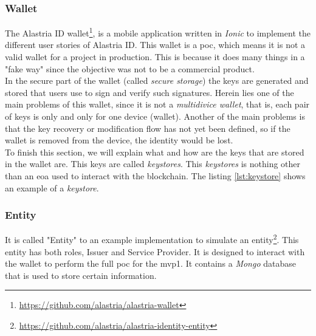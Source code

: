         \subsubsection{Wallet}
            The Alastria ID wallet\footnote{\url{https://github.com/alastria/alastria-wallet}}, is a mobile application written in \textit{Ionic} to implement the different user stories of Alastria ID. This wallet is a \acrfull{poc}, which means it is not a valid wallet for a project in production. This is because it does many things in a "fake way" since the objective was not to be a commercial product.\\
            
            In the secure part of the wallet (called \textit{secure storage}) the keys are generated and stored that users use to sign and verify such signatures. Herein lies one of the main problems of this wallet, since it is not a \textit{multidivice wallet}, that is, each pair of keys is only and only for one device (wallet). Another of the main problems is that the key recovery or modification flow has not yet been defined, so if the wallet is removed from the device, the identity would be lost.\\
            
            To finish this section, we will explain what and how are the keys that are stored in the wallet are. This keys are called \textit{keystores}. This \textit{keystores} is nothing other than an \acrfull{eoa} used to interact with the blockchain. The listing \ref{lst:keystore} shows an example of a \textit{keystore}.
            
        
        \subsubsection{Entity}
            It is called "Entity" to an example implementation to simulate an entity\footnote{\url{https://github.com/alastria/alastria-identity-entity}}. This entity has both roles, Issuer and Service Provider. It is designed to interact with the wallet to perform the full \acrshort{poc} for the \acrshort{mvp}1. It contains a \textit{Mongo} database that is used to store certain information.\\
            
